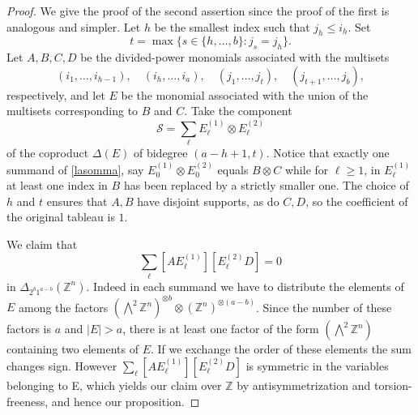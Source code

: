 \documentclass[10pt]{amsart}
\theoremstyle{definition}
\theoremstyle{remark}
\newcommand{\Z}{\mathbb Z}
\newcommand{\ext}{\bigwedge}
\newcommand{\ot}{\otimes}
\begin{document}
\begin{proof} We give the proof of the second assertion since the proof of the first is  analogous and simpler.
Let $h$ be the smallest index such that $j_h\leq i_h$. Set
\[
 t=\max\{s\in\{h,\ldots,b\}:j_s=j_h\}.
\]
Let $A,B,C,D$ be the divided-power monomials associated with the multisets
\[
 (i_1,\ldots,i_{h-1}),\quad(i_h,\ldots,i_a),\quad
 (j_1,\ldots,j_t),\quad(j_{t+1},\ldots,j_b),
\]
respectively, and let $E$ be the monomial associated with the union of the multisets corresponding to $B$ and $C$.
Take the component 
\begin{equation}\label{lasomma}\mathcal S=\sum_\ell E_\ell^{(1)}\ot E_\ell^{(2)}\end{equation}
of the coproduct $\Delta(E)$  of bidegree $(a-h+1,t)$. 
Notice that  exactly one summand of \eqref{lasomma}, say $E_0^{(1)}\ot E_0^{(2)}$ equals $B \otimes C$ while for $\ell\geq 1$, in $E_\ell^{(1)}$ at least one index in $B$ has been replaced by a strictly smaller one. The choice of $h$ and $t$ ensures that $A,B$ have disjoint supports, as do $C,D$, so the coefficient of the original tableau is $1$.



We claim that  
$$\sum_\ell [A E_\ell^{(1)}][ E_\ell^{(2)}D]=0$$
in $\Delta_{2^b1^{a-b}}(\Z^n)$.
Indeed in  each summand we have to distribute the elements of $E$ among the factors $(\ext^2\Z^n)^{\ot b}\ot (\Z^n)^{\ot(a-b)}$. Since the number of these factors is $a$ and $|E|>a$, there is at least one factor of the form $(\ext^2\Z^n)$ containing two elements of $E$. If we exchange the order of these elements the  sum changes sign. However $\sum_\ell [A E_\ell^{(1)}][ E_\ell^{(2)}D]$ is symmetric in   the variables belonging to
E, which yields our claim over $\Z$ by antisymmetrization and torsion-freeness, and hence our proposition. \end{proof}
\end{document}
